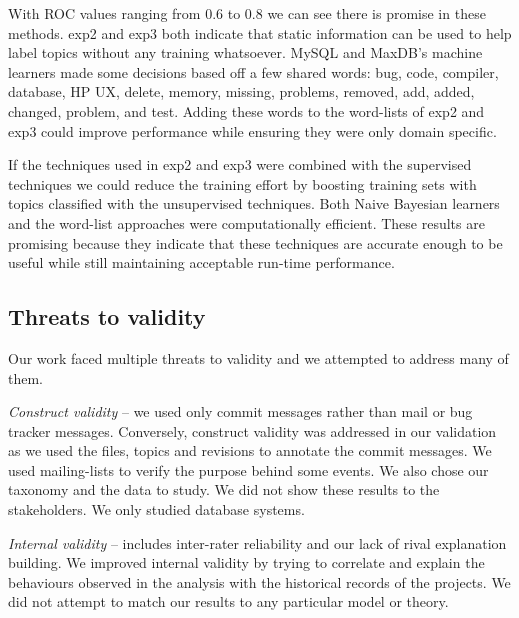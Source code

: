 \documentclass[]{sig-alternate}
\begin{document}
With ROC values ranging from $0.6$ to $0.8$ we can see there is promise in these methods.
\textsf{exp2} and \textsf{exp3} both indicate that static information can be used to help label topics without any training whatsoever. 
MySQL and MaxDB's machine learners made some decisions based off a few shared words: \textsf{bug, code, compiler, database, HP UX, delete, memory, missing, problems, removed, add, added, changed, problem, and test}. 
Adding these words to the word-lists of \textsf{exp2} and \textsf{exp3} could improve performance while ensuring they were only domain specific.

If the techniques used in \textsf{exp2} and \textsf{exp3} were combined with the supervised techniques we could reduce the training effort by boosting training sets with topics classified with the unsupervised techniques.
Both Naive Bayesian learners and the word-list approaches were computationally efficient.  
These results are promising because they indicate that these techniques are accurate enough to be useful while still maintaining acceptable run-time performance.


\subsection{Threats to validity}

Our work faced multiple threats to validity and we attempted to address many of them.

\emph{Construct validity} -- we used only commit messages rather than mail or bug tracker messages. 
Conversely, construct validity was addressed in our validation as we used the files, topics and revisions to annotate the commit messages. 
We used mailing-lists to verify the purpose behind some events.
We also chose our taxonomy and the data to study. We did not show these results to the stakeholders.
We only studied database systems.

\emph{Internal validity} -- includes inter-rater reliability and our lack of rival explanation building. 
We improved internal validity by trying to correlate and explain the behaviours observed in the analysis with the historical records of the projects.
We did not attempt to match our results to any particular model or theory.
\end{document}
